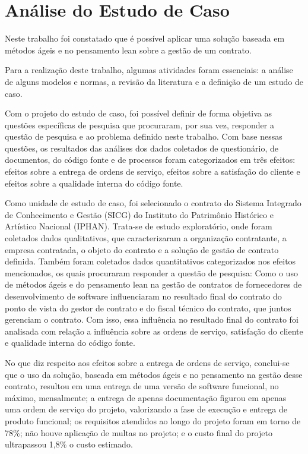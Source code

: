 \section{Análise do Estudo de Caso}
\label{sec:analise}


Neste trabalho foi constatado que é possível aplicar uma solução baseada em métodos ágeis e no pensamento lean sobre a gestão de um contrato.

Para a realização deste trabalho, algumas atividades foram essenciais: a análise de
 alguns modelos e normas, a revisão da literatura e a definição de um estudo de caso.

Com o projeto do estudo de caso, foi possível definir de forma objetiva as questões
 específicas de pesquisa que procuraram, por sua vez, responder a questão de pesquisa e
 ao problema definido neste trabalho. Com base nessas questões, os resultados das análises
 dos dados coletados de questionário, de documentos, do código fonte e de processos foram
 categorizados em três efeitos: efeitos sobre a entrega de ordens de serviço, efeitos sobre a
 satisfação do cliente e efeitos sobre a qualidade interna do código fonte.

Como unidade de estudo de caso, foi selecionado o contrato do Sistema Integrado
 de Conhecimento e Gestão (SICG) do Instituto do Patrimônio Histórico e Artístico Nacional (IPHAN). Trata-se de estudo exploratório, onde foram coletados dados qualitativos,
 que caracterizaram a organização contratante, a empresa contratada, o objeto do contrato
 e a solução de gestão de contrato definida. Também foram coletados dados quantitativos
 categorizados nos efeitos mencionados, os quais procuraram responder a questão de pesquisa: Como o uso de métodos ágeis e do pensamento lean na gestão de contratos de
 fornecedores de desenvolvimento de software influenciaram no resultado final do contrato
 do ponto de vista do gestor de contrato e do fiscal técnico do contrato, que juntos gerenciam o contrato. Com isso, essa influência no resultado final do contrato foi analisada com
 relação a influência sobre as ordens de serviço, satisfação do cliente e qualidade interna
 do código fonte.

No que diz respeito aos efeitos sobre a entrega de ordens de serviço, conclui-se que
 o uso da solução, baseada em métodos ágeis e no pensamento na gestão desse contrato,
 resultou em uma entrega de uma versão de software funcional, no máximo, mensalmente;
 a entrega de apenas documentação figurou em apenas uma ordem de serviço do projeto,
 valorizando a fase de execução e entrega de produto funcional; os requisitos atendidos ao
 longo do projeto foram em torno de 78\%; não houve aplicação de multas no projeto; e o
 custo final do projeto ultrapassou 1,8\% o custo estimado.

